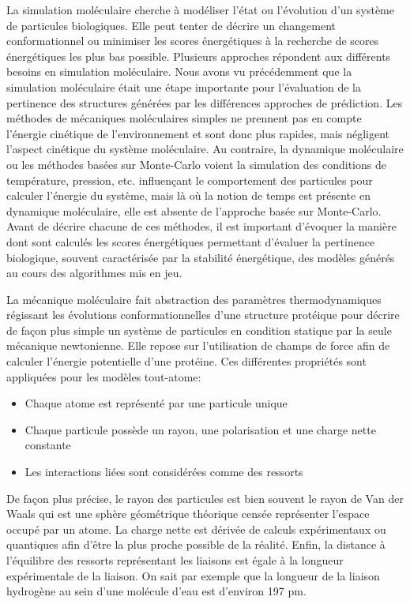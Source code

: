 La simulation moléculaire cherche à modéliser l'état ou l'évolution d'un système de particules biologiques. Elle peut tenter de décrire un changement conformationnel ou minimiser les scores énergétiques à la recherche de scores énergétiques les plus bas possible. Plusieurs approches répondent aux différents besoins en simulation moléculaire. Nous avons vu précédemment que la simulation moléculaire était une étape importante pour l'évaluation de la pertinence des structures générées par les différences approches de prédiction. 
Les méthodes de mécaniques moléculaires simples ne prennent pas en compte l'énergie cinétique de l'environnement et sont donc plus rapides, mais négligent l'aspect cinétique du système moléculaire. Au contraire, la dynamique moléculaire ou les méthodes basées sur Monte-Carlo voient la simulation des conditions de température, pression, etc. influençant le comportement des particules pour calculer l'énergie du système, mais là où la notion de temps est présente en dynamique moléculaire, elle est absente de l'approche basée sur Monte-Carlo.
Avant de décrire chacune de ces méthodes, il est important d'évoquer la manière dont sont calculés les scores énergétiques permettant d'évaluer la pertinence biologique, souvent caractérisée par la stabilité énergétique, des modèles générés au cours des algorithmes mis en jeu.


La mécanique moléculaire fait abstraction des paramètres thermodynamiques régissant les évolutions conformationnelles d'une structure protéique pour décrire de façon plus simple un système de particules en condition statique par la seule mécanique newtonienne. Elle repose sur l'utilisation de champs de force afin de calculer l'énergie potentielle d'une protéine. Ces différentes propriétés sont appliquées pour les modèles tout-atome:

\begin{itemize}
	\item Chaque atome est représenté par une particule unique
	\item Chaque particule possède un rayon, une polarisation et une charge nette constante
	\item Les interactions liées sont considérées comme des ressorts 
\end{itemize}

De façon plus précise, le rayon des particules est bien souvent le rayon de Van der Waals qui est une sphère géométrique théorique censée représenter l'espace occupé par un atome. La charge nette est dérivée de calculs expérimentaux ou quantiques afin d'être la plus proche possible de la réalité. Enfin, la distance à l'équilibre des ressorts représentant les liaisons est égale à la longueur expérimentale de la liaison. On sait par exemple que la longueur de la liaison hydrogène au sein d'une molécule d'eau est d'environ 197 pm.

